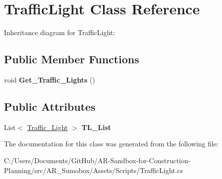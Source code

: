 \hypertarget{class_traffic_light}{}\section{Traffic\+Light Class Reference}
\label{class_traffic_light}
Inheritance diagram for Traffic\+Light\+:\begin{figure}[H]
\begin{center}
\leavevmode
\end{center}
\end{figure}
\subsection*{Public Member Functions}
\begin{DoxyCompactItemize}
\item 
\mbox{\label{class_traffic_light_a6e4dfb980eee8bc5839f5baa81abb8c7}} 
void {\bfseries Get\+\_\+\+Traffic\+\_\+\+Lights} ()
\end{DoxyCompactItemize}
\subsection*{Public Attributes}
\begin{DoxyCompactItemize}
\item 
\mbox{\label{class_traffic_light_a1169232cf22076b25af851a5e44ab703}} 
List$<$ \mbox{\hyperlink{struct_traffic___light}{Traffic\+\_\+\+Light}} $>$ {\bfseries T\+L\+\_\+\+List}
\end{DoxyCompactItemize}


The documentation for this class was generated from the following file\+:\begin{DoxyCompactItemize}
\item 
C\+:/\+Users/\+Documents/\+Git\+Hub/\+A\+R-\/\+Sandbox-\/for-\/\+Construction-\/\+Planning/src/\+A\+R\+\_\+\+Sumobox/\+Assets/\+Scripts/Traffic\+Light.\+cs\end{DoxyCompactItemize}
